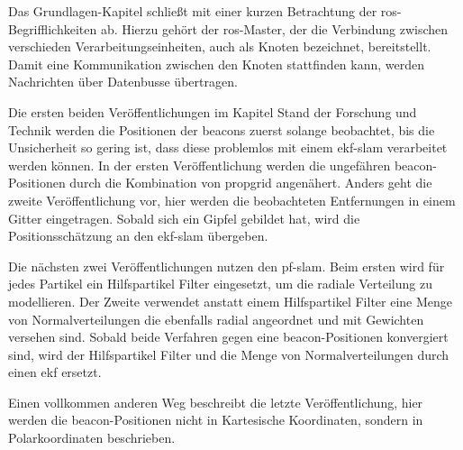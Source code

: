 Das Grundlagen-Kapitel schließt mit einer kurzen Betrachtung der \gls{ros}-Begrifflichkeiten ab. Hierzu gehört der \gls{ros}-Master, der die Verbindung zwischen verschieden Verarbeitungseinheiten, auch als Knoten bezeichnet, bereitstellt. Damit eine Kommunikation zwischen den Knoten stattfinden kann, werden Nachrichten über Datenbusse übertragen.

Die ersten beiden Veröffentlichungen im Kapitel Stand der Forschung und Technik werden die Positionen der \glspl{beacon} zuerst solange beobachtet, bis die Unsicherheit so gering ist, dass diese problemlos mit einem \gls{ekf}-\gls{slam} verarbeitet werden können. In der ersten Veröffentlichung werden die ungefähren \gls{beacon}-Positionen durch die Kombination von \gls{propgrid} angenähert. Anders geht die zweite Veröffentlichung vor, hier werden die beobachteten Entfernungen in einem Gitter eingetragen. Sobald sich ein Gipfel gebildet hat, wird die Positionsschätzung an den \gls{ekf}-\gls{slam} übergeben.

Die nächsten zwei Veröffentlichungen nutzen den \gls{pf}-\gls{slam}. Beim ersten wird für jedes Partikel ein Hilfspartikel Filter eingesetzt, um die radiale Verteilung zu modellieren. Der Zweite verwendet anstatt einem Hilfspartikel Filter eine Menge von Normalverteilungen die ebenfalls radial angeordnet und mit Gewichten versehen sind. Sobald beide Verfahren gegen eine \gls{beacon}-Positionen konvergiert sind, wird der Hilfspartikel Filter und die Menge von Normalverteilungen durch einen \gls{ekf} ersetzt.

Einen vollkommen anderen Weg beschreibt die letzte Veröffentlichung, hier werden die \gls{beacon}-Positionen nicht in Kartesische Koordinaten, sondern in Polarkoordinaten beschrieben.






